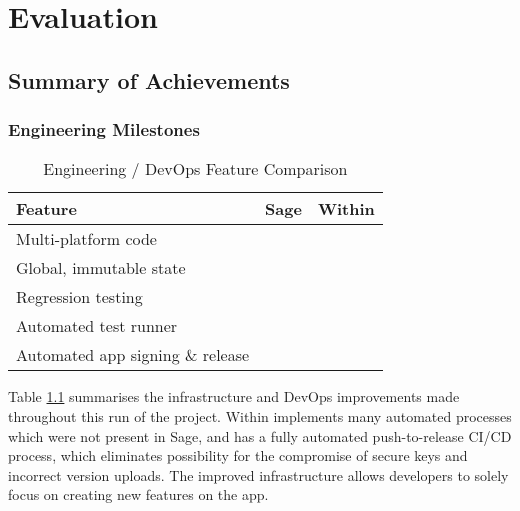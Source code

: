 \chapter{Evaluation}
\section{Summary of Achievements}
\subsection{Engineering Milestones}
\begin{table}[h]
	\centering
	\begin{tabular}{l|cc}
		Feature                          & Sage & Within     \\
		\hline
		Multi-platform code              &      & \checkmark \\
		Global, immutable state          &      & \checkmark \\
		Regression testing               &      & \checkmark \\
		Automated test runner            &      & \checkmark \\
		Automated app signing \& release &      & \checkmark \\
	\end{tabular}
	\caption{Engineering / DevOps Feature Comparison}
	\label{tab:devops_milestones}
\end{table}

Table \ref{tab:devops_milestones} summarises the infrastructure and DevOps improvements made throughout this run of the project. Within implements many automated processes which were not present in Sage, and has a fully automated push-to-release CI/CD process, which eliminates possibility for the compromise of secure keys and incorrect version uploads. The improved infrastructure allows developers to solely focus on creating new features on the app.

